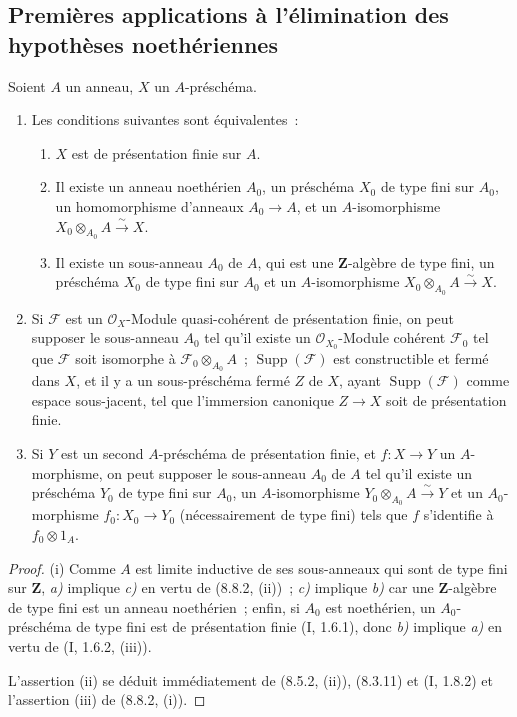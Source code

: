\subsection{Premières applications à l'élimination des hypothèses noethériennes}
\label{subsection:IV.8.9-fr}

\begin{proposition}[8.9.1]
Soient $A$ un anneau, $X$ un $A$-préschéma.
\begin{enumerate}
\item[(i)] Les conditions suivantes sont équivalentes~:
\begin{enumerate}
\item[\emph{a)}] $X$ est de présentation finie sur $A$.
\item[\emph{b)}] Il existe un anneau noethérien $A_0$, un préschéma $X_0$ de
type fini sur $A_0$, un homomorphisme d'anneaux $A_0\to A$, et un
$A$-isomorphisme $X_0\otimes_{A_0}A\xrightarrow{\sim}X$.
\item[\emph{c)}] Il existe un sous-anneau $A_0$ de $A$, qui est une
$\mathbf Z$-algèbre de type fini, un préschéma $X_0$ de type fini sur $A_0$ et
un $A$-isomorphisme $X_0\otimes_{A_0}A\xrightarrow{\sim}X$.
\end{enumerate}
\item[(ii)] Si $\mathcal F$ est un $\mathcal O_X$-Module quasi-cohérent de
présentation finie, on peut supposer le sous-anneau $A_0$ tel qu'il existe un
$\mathcal O_{X_0}$-Module cohérent $\mathcal F_0$ tel que $\mathcal F$ soit
isomorphe à $\mathcal F_0\otimes_{A_0}A$~;
$\operatorname{Supp}(\mathcal F)$ est constructible et fermé dans $X$, et il
y a un sous-préschéma fermé $Z$ de $X$, ayant
$\operatorname{Supp}(\mathcal F)$ comme espace sous-jacent, tel que
l'immersion canonique $Z\to X$ soit de présentation finie.
\item[(iii)] Si $Y$ est un second $A$-préschéma de présentation finie, et
$f:X\to Y$ un $A$-morphisme, on peut supposer le sous-anneau $A_0$ de $A$ tel
qu'il existe un préschéma $Y_0$ de type fini sur $A_0$, un $A$-isomorphisme
$Y_0\otimes_{A_0}A\xrightarrow{\sim}Y$ et un $A_0$-morphisme
$f_0:X_0\to Y_0$ (nécessairement de type fini) tels que $f$ s'identifie à
$f_0\otimes1_A$.
\end{enumerate}
\end{proposition}

\begin{proof}
(i) Comme $A$ est limite inductive de ses sous-anneaux qui sont de type fini
sur $\mathbf Z$, \emph{a)} implique \emph{c)} en vertu de (8.8.2, (ii))~;
\emph{c)} implique \emph{b)} car une $\mathbf Z$-algèbre de type fini est un
anneau noethérien~; enfin, si $A_0$ est noethérien, un $A_0$-préschéma de type
fini est de présentation finie (I, 1.6.1), donc \emph{b)} implique \emph{a)}
en vertu de (I, 1.6.2, (iii)).

L'assertion (ii) se déduit immédiatement de (8.5.2, (ii)), (8.3.11) et
(I, 1.8.2) et l'assertion (iii) de (8.8.2, (i)).
\end{proof}

